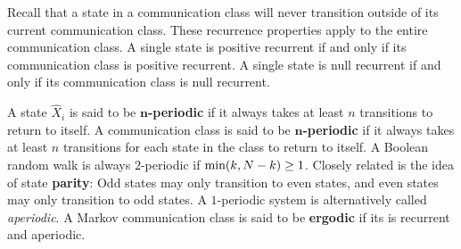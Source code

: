\documentclass[10pt, a5paper, twoside, openright]{memoir}
\begin{document}
Recall that a state in a communication class will never transition outside of its current communication class. These recurrence properties apply to the entire communication class. A single state is positive recurrent if and only if its communication class is positive recurrent. A single state is null recurrent if and only if its communication class is null recurrent.

A state $\hat X_i$ is said to be $\boldsymbol n$\textbf{-periodic} if it always takes at least $n$ transitions to return to itself. A communication class is said to be $\boldsymbol n$\textbf{-periodic}  if it always takes at least $n$ transitions for each state in the class to return to itself. A Boolean random walk is always $2$-periodic if $\textnormal{min}(k, N-k) \geq 1$. Closely related is the idea of state \textbf{parity}: Odd states may only transition to even states, and even states may only transition to odd states. A $1$-periodic system is alternatively called \textit{aperiodic}. A Markov communication class is said to be \textbf{ergodic} if its is recurrent and aperiodic.
\end{document}
